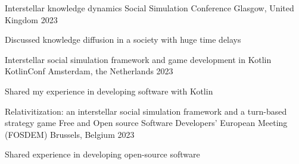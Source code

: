 

\begin{cventries}

  \cventry
    {Interstellar knowledge dynamics} %
    {Social Simulation Conference} %
    {Glasgow, United Kingdom} %
    {2023} %
    {
      \begin{cvitems} %
        \item {Discussed knowledge diffusion in a society with huge time delays}
      \end{cvitems}
    }

  \cventry
    {Interstellar social simulation framework and game development in Kotlin} %
    {KotlinConf} %
    {Amsterdam, the Netherlands} %
    {2023} %
    {
      \begin{cvitems} %
        \item {Shared my experience in developing software with Kotlin}
      \end{cvitems}
    }


  \cventry
    {Relativitization: an interstellar social simulation framework and a turn-based strategy game} %
    {Free and Open source Software Developers' European Meeting (FOSDEM)} %
    {Brussels, Belgium} %
    {2023} %
    {
      \begin{cvitems} %
        \item {Shared experience in developing open-source software}
      \end{cvitems}
    }


\end{cventries}
